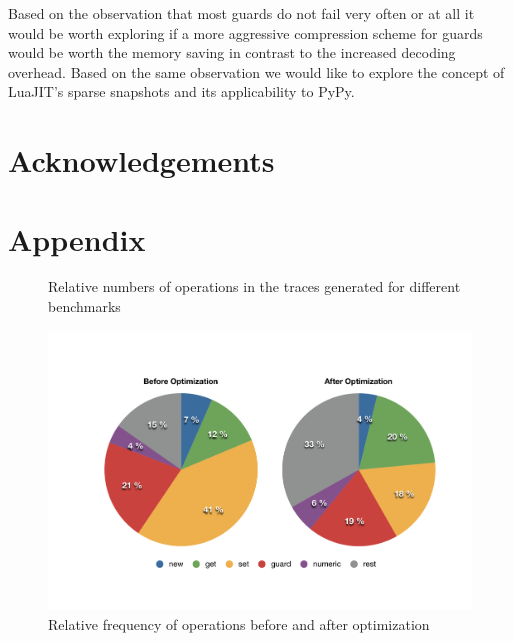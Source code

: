 \documentclass[10pt,preprint]{sigplanconf}
\begin{document}
Based on the observation that most guards do not fail very often or at all it
would be worth exploring if a more aggressive compression scheme for guards
would be worth the memory saving in contrast to the increased decoding
overhead. Based on the same observation we would like to explore the concept of
LuaJIT's sparse snapshots and its applicability to PyPy.

\section*{Acknowledgements}
\section*{Appendix}
\begin{figure}
    
    \caption{Relative numbers of operations in the traces generated for
    different benchmarks}
    \label{fig:ops_count}
\end{figure}
\begin{figure}
\centering
\includegraphics[width=\textwidth]{figures/ops_pie.pdf}
\caption{Relative frequency of operations before and after optimization}
\label{fig:ops_pie}
\end{figure}


\listoftodos
\end{document}
